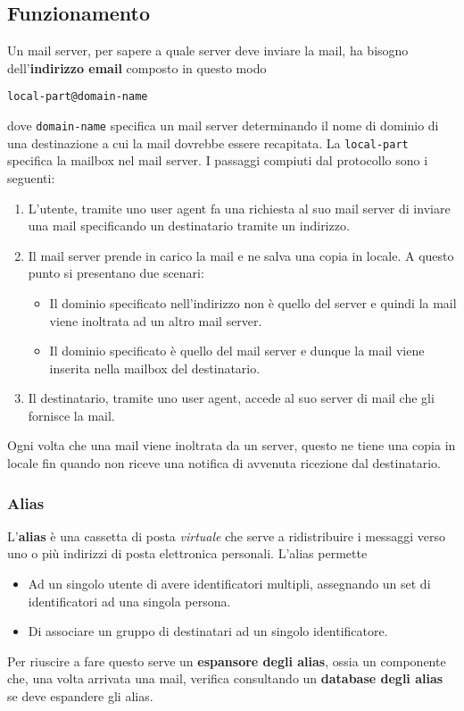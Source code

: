 \subsection{Funzionamento}
Un mail server, per sapere a quale server deve inviare la mail, ha 
bisogno dell'\textbf{indirizzo email} composto in questo modo
\begin{center}
	\verb|local-part@domain-name|
\end{center}
dove \verb|domain-name| specifica un mail server determinando il nome 
di dominio di una destinazione a cui la mail dovrebbe essere 
recapitata. La \verb|local-part| specifica la mailbox nel mail server. 
I passaggi compiuti dal protocollo sono i seguenti:
\begin{enumerate}
	\item L'utente, tramite uno user agent fa una richiesta al suo 
		mail server di inviare una mail specificando un destinatario 
		tramite un indirizzo.
	\item Il mail server prende in carico la mail e ne salva una copia 
		in locale. A questo punto si presentano due scenari:
		\begin{itemize}
			\item Il dominio specificato nell'indirizzo non è quello 
				del server e quindi la mail viene inoltrata ad un altro
				mail server.
			\item Il dominio specificato è quello del mail server e 
				dunque la mail viene inserita nella mailbox del 
				destinatario.
		\end{itemize}
	\item Il destinatario, tramite uno user agent, accede al suo server
		di mail che gli fornisce la mail.
\end{enumerate}
Ogni volta che una mail viene inoltrata da un server, questo ne tiene 
una copia in locale fin quando non riceve una notifica di avvenuta 
ricezione dal destinatario.

\subsubsection{Alias}
L'\textbf{alias} è una cassetta di posta \emph{virtuale} che serve a 
ridistribuire i messaggi verso uno o più indirizzi di posta elettronica
personali. L'alias permette
\begin{itemize}
	\item Ad un singolo utente di avere identificatori multipli, 
		assegnando un set di identificatori ad una singola persona.
	\item Di associare un gruppo di destinatari ad un singolo 
		identificatore.
\end{itemize}
Per riuscire a fare questo serve un \textbf{espansore degli alias}, 
ossia un componente che, una volta arrivata una mail, verifica
consultando un \textbf{database degli alias} se deve espandere gli 
alias.

